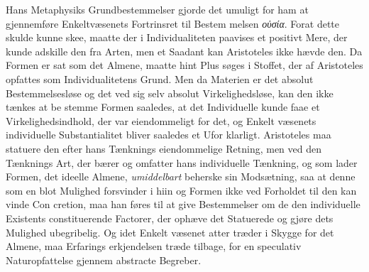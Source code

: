 \documentclass[12pt,a4paper]{book}
\newcommand{\gk}[1]{\textit{#1}}
\begin{document}
Hans Metaphysiks Grundbestemmelser gjorde det umuligt
for ham at gjennemføre Enkeltvæsenets Fortrinsret til Bestem\-%
melsen \gk{οὐσία}. Forat dette skulde kunne skee, maatte der i
Individualiteten paavises et positivt Mere, der kunde adskille
den fra Arten, men et Saadant kan Aristoteles ikke hævde den.
Da Formen er sat som det Almene, maatte hint Plus søges i
Stoffet, der af Aristoteles opfattes som Individualitetens Grund.
Men da Materien er det absolut Bestemmelsesløse og det ved
sig selv absolut Virkelighedsløse, kan den ikke tænkes at be\-%
stemme Formen saaledes, at det Individuelle kunde faae et
Virkelighedsindhold, der var eiendommeligt for det, og Enkelt\-%
væsenets individuelle Substantialitet bliver saaledes et Ufor\-%
klarligt. Aristoteles maa statuere den efter hans Tænknings
eiendommelige Retning, men ved den Tænknings Art, der
bærer og omfatter hans individuelle Tænkning, og som lader
Formen, det ideelle Almene, \emph{umiddelbart} beherske sin
Modsætning, saa at denne som en blot Mulighed forsvinder i
hiin og Formen ikke ved Forholdet til den kan vinde Con\-%
cretion, maa han føres til at give Bestemmelser om de den
individuelle Existents constituerende Factorer, der ophæve det
Statuerede og gjøre dets Mulighed ubegribelig. Og idet Enkelt\-%
væsenet atter træder i Skygge for det Almene, maa Erfarings\-%
erkjendelsen træde tilbage, for en speculativ Naturopfattelse
gjennem abstracte Begreber.
\end{document}
